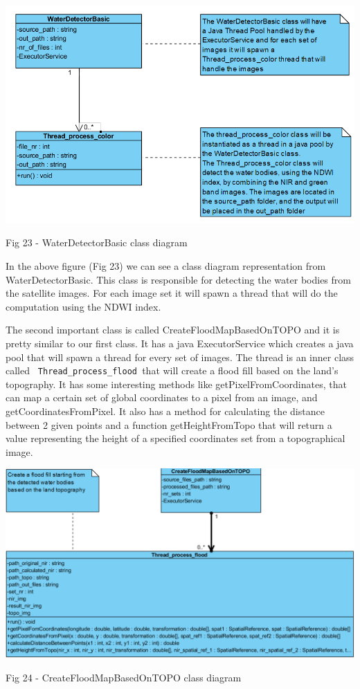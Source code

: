 \documentclass[12pt, a4paper]{report}
\begin{document}
\medskip
\includegraphics[scale=0.6, center]{WaterDetectorBasic_class.png}
\begin{center}
Fig 23 - WaterDetectorBasic class diagram
\end{center}
\par 

In the above figure (Fig 23) we can see a class diagram representation from WaterDetectorBasic. This class is responsible for detecting the water bodies from the satellite images. For each image set it will spawn a thread that will do the computation using the NDWI index.
\par 

The second important class is called CreateFloodMapBasedOnTOPO and it is pretty similar to our first class. It has a java ExecutorService which creates a java pool that will spawn a thread for every set of images. The thread is an inner class called \texttt{ Thread\_process\_flood }that will create a flood fill based on the land's topography. It has some interesting methods like getPixelFromCoordinates, that can map a certain set of global coordinates to a pixel from an image, and getCoordinatesFromPixel. It also has a method for calculating the distance between 2 given points and a function getHeightFromTopo that will return a value representing the height of a specified coordinates set from a topographical image.

\bigskip
\includegraphics[scale=0.55, center]{CreateFloodMapBasedOnTOPO_class.png}
\begin{center}
Fig 24 - CreateFloodMapBasedOnTOPO class diagram
\end{center}
\par 
\end{document}
